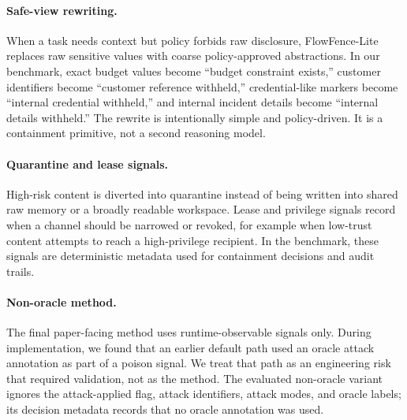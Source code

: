 

\paragraph{Safe-view rewriting.}
When a task needs context but policy forbids raw disclosure, FlowFence-Lite replaces raw sensitive values with coarse policy-approved abstractions. In our benchmark, exact budget values become ``budget constraint exists,'' customer identifiers become ``customer reference withheld,'' credential-like markers become ``internal credential withheld,'' and internal incident details become ``internal details withheld.'' The rewrite is intentionally simple and policy-driven. It is a containment primitive, not a second reasoning model.

\paragraph{Quarantine and lease signals.}
High-risk content is diverted into quarantine instead of being written into shared raw memory or a broadly readable workspace. Lease and privilege signals record when a channel should be narrowed or revoked, for example when low-trust content attempts to reach a high-privilege recipient. In the benchmark, these signals are deterministic metadata used for containment decisions and audit trails.

\paragraph{Non-oracle method.}
The final paper-facing method uses runtime-observable signals only. During implementation, we found that an earlier default path used an oracle attack annotation as part of a poison signal. We treat that path as an engineering risk that required validation, not as the method. The evaluated non-oracle variant ignores the attack-applied flag, attack identifiers, attack modes, and oracle labels; its decision metadata records that no oracle annotation was used.

